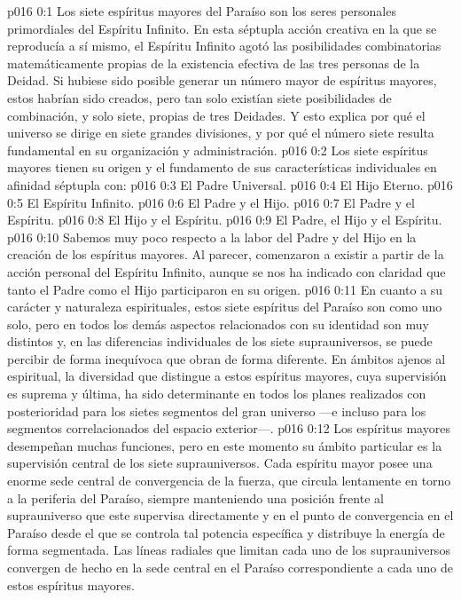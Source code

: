 \author{Censor universal}
\vs p016 0:1 Los siete espíritus mayores del Paraíso son los seres personales primordiales del Espíritu Infinito. En esta séptupla acción creativa en la que se reproducía a sí mismo, el Espíritu Infinito agotó las posibilidades combinatorias matemáticamente propias de la existencia efectiva de las tres personas de la Deidad. Si hubiese sido posible generar un número mayor de espíritus mayores, estos habrían sido creados, pero tan solo existían siete posibilidades de combinación, y solo siete, propias de tres Deidades. Y esto explica por qué el universo se dirige en siete grandes divisiones, y por qué el número siete resulta fundamental en su organización y administración.
\vs p016 0:2 Los siete espíritus mayores tienen su origen y el fundamento de sus características individuales en afinidad séptupla con:
\vs p016 0:3 El Padre Universal.
\vs p016 0:4 El Hijo Eterno.
\vs p016 0:5 El Espíritu Infinito.
\vs p016 0:6 El Padre y el Hijo.
\vs p016 0:7 El Padre y el Espíritu.
\vs p016 0:8 El Hijo y el Espíritu.
\vs p016 0:9 El Padre, el Hijo y el Espíritu.
\vs p016 0:10 \pc Sabemos muy poco respecto a la labor del Padre y del Hijo en la creación de los espíritus mayores. Al parecer, comenzaron a existir a partir de la acción personal del Espíritu Infinito, aunque se nos ha indicado con claridad que tanto el Padre como el Hijo participaron en su origen.
\vs p016 0:11 En cuanto a su carácter y naturaleza espirituales, estos siete espíritus del Paraíso son como uno solo, pero en todos los demás aspectos relacionados con su identidad son muy distintos y, en las diferencias individuales de los siete suprauniversos, se puede percibir de forma inequívoca que obran de forma diferente. En ámbitos ajenos al espiritual, la diversidad que distingue a estos espíritus mayores, cuya supervisión es suprema y última, ha sido determinante en todos los planes realizados con posterioridad para los sietes segmentos del gran universo ---e incluso para los segmentos correlacionados del espacio exterior---.
\vs p016 0:12 Los espíritus mayores desempeñan muchas funciones, pero en este momento su ámbito particular es la supervisión central de los siete suprauniversos. Cada espíritu mayor posee una enorme sede central de convergencia de la fuerza, que circula lentamente en torno a la periferia del Paraíso, siempre manteniendo una posición frente al suprauniverso que este supervisa directamente y en el punto de convergencia en el Paraíso desde el que se controla tal potencia específica y distribuye la energía de forma segmentada. Las líneas radiales que limitan cada uno de los suprauniversos convergen de hecho en la sede central en el Paraíso correspondiente a cada uno de estos espíritus mayores.

